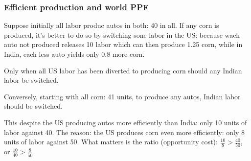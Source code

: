 \subsubsection{Efficient production and world PPF}

Suppose initially all labor produc autos in both: 40 in all.
If any corn is produced, it's better to do so by switching sone labor in the US:
because wach auto not produced releases 10 labor which can then produce 1.25 corn,
while in India, each less auto yields only 0.8 more corn.

Only when all US labor has been diverted to producing corn
should any Indian labor be switched.

Conversely, starting with all corn: 41 units, to produce any autos,
Indian labor should be switched.

This despite the US producing autos more efficiently than India: only
10 units of labor against 40. The reason: the US produces corn even
more efficiently: only 8 units of labor against 50. What matters is the
ratio (opportunity cost): $\frac{10}{8} > \frac{40}{50}$, or $\frac{10}{40} > \frac{8}{50}$.

\begin{center}
\end{center}

